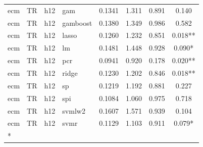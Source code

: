 \begin{ThreePartTable}
\begin{longtable}[t]{llclcccc}
ecm & TR & h12 & gam & 0.1341 & 1.311 & 0.891 & 0.140\\
ecm & TR & h12 & gamboost & 0.1380 & 1.349 & 0.986 & 0.582\\
ecm & TR & h12 & lasso & 0.1260 & 1.232 & 0.851 & 0.018**\\
ecm & TR & h12 & lm & 0.1481 & 1.448 & 0.928 & 0.090*\\
ecm & TR & h12 & pcr & 0.0941 & 0.920 & 0.178 & 0.020**\\
ecm & TR & h12 & ridge & 0.1230 & 1.202 & 0.846 & 0.018**\\
ecm & TR & h12 & sp & 0.1219 & 1.192 & 0.881 & 0.227\\
ecm & TR & h12 & spi & 0.1084 & 1.060 & 0.975 & 0.718\\
ecm & TR & h12 & svmlw2 & 0.1607 & 1.571 & 0.939 & 0.104\\
ecm & TR & h12 & svmr & 0.1129 & 1.103 & 0.911 & 0.079*\\*
\end{longtable}
\end{ThreePartTable}
\endgroup{}
